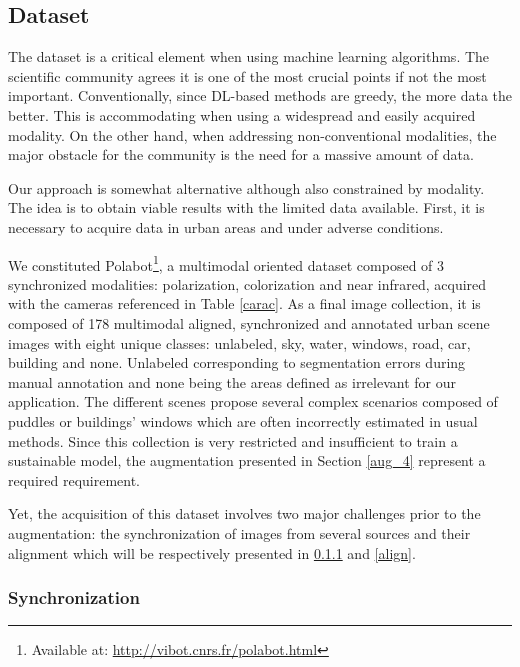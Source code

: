 \subsection{Dataset}\label{data_pol}

The dataset is a critical element when using machine learning algorithms. The scientific community agrees it is one of the most crucial points if not the most important.
Conventionally, since DL-based methods are greedy, the more data the better. This is accommodating when using a widespread and easily acquired modality. On the other hand, when addressing non-conventional modalities, the major obstacle for the community is the need for a massive amount of data.

Our approach is somewhat alternative although also constrained by modality. The idea is to obtain viable results with the limited data available.
First, it is necessary to acquire data in urban areas and under adverse conditions.

We constituted Polabot\footnote{Available at: \url{http://vibot.cnrs.fr/polabot.html}}, a multimodal oriented dataset composed of 3 synchronized modalities: polarization, colorization and near infrared, acquired with the cameras referenced in Table \ref{carac}. 
As a final image collection, it is composed of 178 multimodal aligned, synchronized and annotated urban scene images with eight unique classes: unlabeled, sky, water, windows, road, car, building and none. Unlabeled corresponding to segmentation errors during manual annotation and none being the areas defined as irrelevant for our application. The different scenes propose several complex scenarios composed of puddles or buildings' windows which are often incorrectly estimated in usual methods.
Since this collection is very restricted and insufficient to train a sustainable model, the augmentation presented in Section \ref{aug_4} represent a required requirement.

Yet, the acquisition of this dataset involves two major challenges prior to the augmentation: the synchronization of images from several sources and their alignment which will be respectively presented in \ref{sync} and \ref{align}.

\subsubsection{Synchronization}\label{sync}

